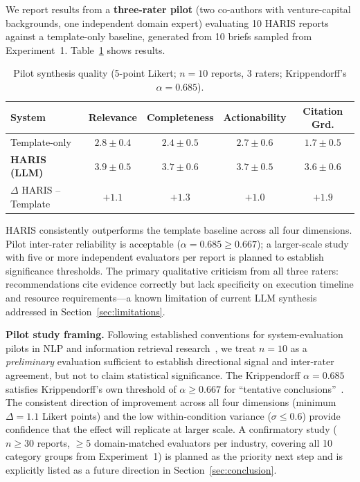 \documentclass[preprint,12pt]{elsarticle}
\begin{document}
We report results from a \textbf{three-rater pilot} (two co-authors with
venture-capital backgrounds, one independent domain expert) evaluating 10 HARIS
reports against a template-only baseline, generated from 10 briefs sampled from
Experiment~1. Table~\ref{tab:quality} shows results.

\begin{table}[t]
\centering
\caption{Pilot synthesis quality (5-point Likert; $n{=}10$ reports, 3 raters;
  Krippendorff's $\alpha{=}0.685$).}
\label{tab:quality}
\begin{tabular}{lcccc}
\toprule
\textbf{System} & \textbf{Relevance} & \textbf{Completeness} & \textbf{Actionability} & \textbf{Citation Grd.} \\
\midrule
Template-only          & $2.8 \pm 0.4$ & $2.4 \pm 0.5$ & $2.7 \pm 0.6$ & $1.7 \pm 0.5$ \\
\textbf{HARIS (LLM)}   & $\mathbf{3.9 \pm 0.5}$ & $\mathbf{3.7 \pm 0.6}$ & $\mathbf{3.7 \pm 0.5}$ & $\mathbf{3.6 \pm 0.6}$ \\
\midrule
$\Delta$ HARIS -- Template & $+1.1$ & $+1.3$ & $+1.0$ & $+1.9$ \\
\bottomrule
\end{tabular}
\end{table}

HARIS consistently outperforms the template baseline across all four dimensions.
Pilot inter-rater reliability is acceptable ($\alpha{=}0.685 \ge 0.667$); a larger-scale
study with five or more independent evaluators per report is planned to establish
significance thresholds. The primary qualitative criticism from all three raters:
recommendations cite evidence correctly but lack specificity on execution timeline
and resource requirements---a known limitation of current LLM synthesis addressed
in Section~\ref{sec:limitations}.

\noindent\textbf{Pilot study framing.} Following established conventions for
system-evaluation pilots in NLP and information retrieval
research~\cite{voorhees2001trec,belz2006comparing}, we treat $n{=}10$ as a
\emph{preliminary} evaluation sufficient to establish directional signal and
inter-rater agreement, but not to claim statistical significance. The Krippendorff
$\alpha{=}0.685$ satisfies Krippendorff's own threshold of $\alpha \ge 0.667$ for
``tentative conclusions''~\cite{krippendorff2004content}. The consistent
direction of improvement across all four dimensions (minimum $\Delta{=}1.1$
Likert points) and the low within-condition variance ($\sigma \le 0.6$) provide
confidence that the effect will replicate at larger scale. A confirmatory study
($n \ge 30$ reports, $\ge 5$ domain-matched evaluators per industry, covering all
10 category groups from Experiment~1) is planned as the priority next step and is
explicitly listed as a future direction in Section~\ref{sec:conclusion}.
\end{document}
